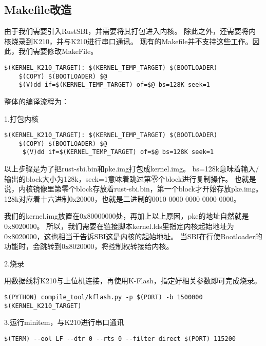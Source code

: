 \subsection{Makefile改造}

由于我们需要引入RustSBI，并需要将其打包进入内核。
除此之外，还需要将内核烧录到K210，并与K210进行串口通讯。
现有的Makefile并不支持这些工作。因此，我们需要修改MakeFile\cite{Ma2006Analyse}。

\begin{lstlisting}[caption={修改Makefile}, label={lst:change_makefile}]
    $(KERNEL_K210_TARGET): $(KERNEL_TEMP_TARGET) $(BOOTLOADER)
    $(COPY) $(BOOTLOADER) $@
    $(V)dd if=$(KERNEL_TEMP_TARGET) of=$@ bs=128K seek=1
\end{lstlisting}

整体的编译流程为：

1.打包内核

\begin{lstlisting}[caption={打包内核}, label={lst:pack_kernel}]
    $(KERNEL_K210_TARGET): $(KERNEL_TEMP_TARGET) $(BOOTLOADER)
    $(COPY) $(BOOTLOADER) $@
     $(V)dd if=$(KERNEL_TEMP_TARGET) of=$@ bs=128K seek=1
\end{lstlisting}


以上步骤是为了把rust-sbi.bin和pke.img打包成kernel.img。
bs=128k意味着输入/输出的block大小为128k，seek=1意味着跳过第零个block进行复制操作。
也就是说，内核镜像里第零个block存放着rust-sbi.bin，第一个block才开始存放pke.img。
128k对应着十六进制0x20000，也就是二进制的0010 0000 0000 0000 0000。

我们的kernel.img放置在0x80000000处，再加上以上原因，pke的地址自然就是0x8020000。
所以，我们需要在链接脚本kernel.lds里指定内核起始地址为0x8020000，这也相当于告诉SBI这是内核的起始地址。
当SBI在行使Bootloader的功能时，会跳转到0x8020000，将控制权转接给内核。

2.烧录

用数据线将K210与上位机连接，再使用K-Flash，指定好相关参数即可完成烧录。

\begin{lstlisting}[caption={烧录}, label={lst:burn}]
    $(PYTHON) compile_tool/kflash.py -p $(PORT) -b 1500000 $(KERNEL_K210_TARGET)
\end{lstlisting}

3.运行minitem，与K210进行串口通讯

\begin{lstlisting}[caption={运行minitem}, label={lst:run_minitem}]
    $(TERM) --eol LF --dtr 0 --rts 0 --filter direct $(PORT) 115200
\end{lstlisting}


